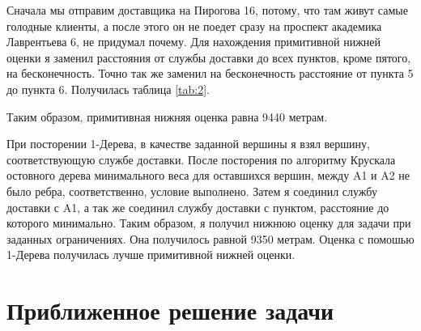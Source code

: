\documentclass[]{article}
\begin{document}
Сначала мы отправим доставщика на Пирогова 16, потому, что там живут самые голодные клиенты,
а после этого он не поедет сразу на проспект академика Лаврентьева 6, не придумал почему.
Для нахождения примитивной нижней оценки я заменил расстояния от службы доставки до
всех пунктов, кроме пятого, на бесконечность. Точно так же заменил на бесконечность расстояние
от пункта 5 до пункта 6. Получилась таблица \ref{tab:2}.
\par
Таким образом, примитивная нижняя оценка равна 9440 метрам.
\par
При посторении 1-Дерева, в качестве заданной вершины я взял вершину,
соответствующую службе доставки. После посторения по алгоритму Крускала
остовного дерева минимального веса для оставшихся вершин, между A1 и A2 не
было ребра, соответственно, условие выполнено.
Затем я соединил службу доставки с A1, а так же соединил службу доставки с пунктом,
расстояние до которого минимально. Таким образом, я получил нижнюю оценку для
задачи при заданных ограничениях. Она получилось равной 9350 метрам.
Оценка с помошью 1-Дерева получилась лучше примитивной нижней оценки.
\par
\section{Приближенное решение задачи}
\par\indent
\end{document}
